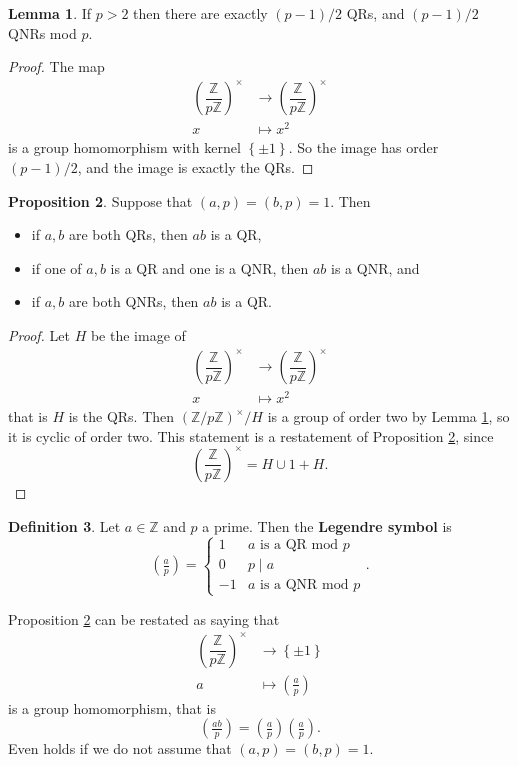 \documentclass{article}
\newcommand{\Z}{\mathbb{Z}}
\newcommand{\rb}[1]{\left( #1 \right)}
\newcommand{\cb}[1]{\left\{ #1 \right\}}
\newcommand{\Unit}[1]{\rb{\dfrac{\Z}{#1\Z}}^\times}
\newcommand{\unit}[1]{\rb{\Z / #1\Z}^\times}
\newcommand{\legendre}[2]{\rb{\tfrac{#1}{#2}}}
\theoremstyle{definition}\newtheorem{definition}{Definition}
\theoremstyle{definition}\newtheorem{remark}[definition]{Remark}
\theoremstyle{definition}\newtheorem*{example}{Example}
\theoremstyle{definition}\newtheorem*{note}{Note}
\newtheorem{proposition}[definition]{Proposition}
\newtheorem{lemma}[definition]{Lemma}
\begin{document}
\begin{lemma}
\label{lem:34}
If $ p > 2 $ then there are exactly $ \rb{p - 1} / 2 $ QRs, and $ \rb{p - 1} / 2 $ QNRs mod $ p $.
\end{lemma}

\begin{proof}
The map
\begin{align*}
\Unit{p} & \to \Unit{p} \\
x & \mapsto x^2
\end{align*}
is a group homomorphism with kernel $ \cb{\pm 1} $. So the image has order $ \rb{p - 1} / 2 $, and the image is exactly the QRs.
\end{proof}

\begin{proposition}
\label{prop:35}
Suppose that $ \rb{a, p} = \rb{b, p} = 1 $. Then
\begin{itemize}
\item if $ a, b $ are both QRs, then $ ab $ is a QR,
\item if one of $ a, b $ is a QR and one is a QNR, then $ ab $ is a QNR, and
\item if $ a, b $ are both QNRs, then $ ab $ is a QR.
\end{itemize}
\end{proposition}

\begin{proof}
Let $ H $ be the image of
\begin{align*}
\Unit{p} & \to \Unit{p} \\
x & \mapsto x^2
\end{align*}
that is $ H $ is the QRs. Then $ \unit{p} / H $ is a group of order two by Lemma \ref{lem:34}, so it is cyclic of order two. This statement is a restatement of Proposition \ref{prop:35}, since
$$ \Unit{p} = H \cup 1 + H. $$
\end{proof}

\begin{definition}
Let $ a \in \Z $ and $ p $ a prime. Then the \textbf{Legendre symbol} is
$$ \legendre{a}{p} = \begin{cases}
1 & a \text{ is a QR mod } p \\
0 & p \mid a \\
-1 & a \text{ is a QNR mod } p
\end{cases}. $$
\end{definition}

Proposition \ref{prop:35} can be restated as saying that
\begin{align*}
\Unit{p} & \to \cb{\pm 1} \\
a & \mapsto \legendre{a}{p}
\end{align*}
is a group homomorphism, that is
$$ \legendre{ab}{p} = \legendre{a}{p}\legendre{a}{p}. $$
Even holds if we do not assume that $ \rb{a, p} = \rb{b, p} = 1 $.
\end{document}
